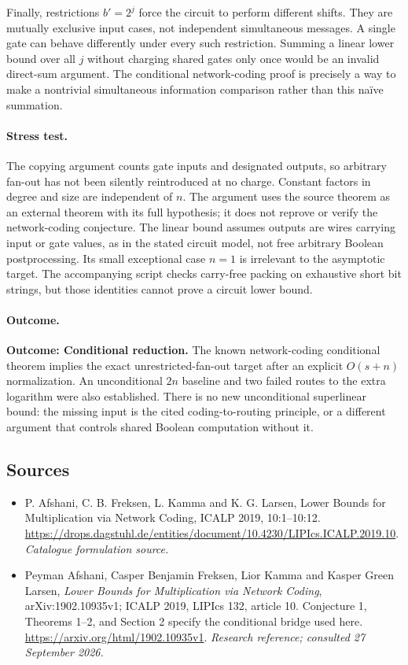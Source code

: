 \documentclass[11pt,a4paper]{article}
\numberwithin{equation}{section}
\begin{document}
Finally, restrictions $b'=2^j$ force the circuit to perform different shifts. They are mutually exclusive input cases, not independent simultaneous messages. A single gate can behave differently under every such restriction. Summing a linear lower bound over all $j$ without charging shared gates only once would be an invalid direct-sum argument. The conditional network-coding proof is precisely a way to make a nontrivial simultaneous information comparison rather than this naïve summation.

\paragraph{Stress test.}
The copying argument counts gate inputs and designated outputs, so arbitrary fan-out has not been silently reintroduced at no charge. Constant factors in degree and size are independent of $n$. The argument uses the source theorem as an external theorem with its full hypothesis; it does not reprove or verify the network-coding conjecture. The linear bound assumes outputs are wires carrying input or gate values, as in the stated circuit model, not free arbitrary Boolean postprocessing. Its small exceptional case $n=1$ is irrelevant to the asymptotic target. The accompanying script checks carry-free packing on exhaustive short bit strings, but those identities cannot prove a circuit lower bound.

\paragraph{Outcome.}
\textbf{Outcome: Conditional reduction.}
The known network-coding conditional theorem implies the exact unrestricted-fan-out target after an explicit $O(s+n)$ normalization. An unconditional $2n$ baseline and two failed routes to the extra logarithm were also established. There is no new unconditional superlinear bound: the missing input is the cited coding-to-routing principle, or a different argument that controls shared Boolean computation without it.

\subsection{Sources}
\begin{itemize}\raggedright
\item[\textnormal{[S1]}]\hypertarget{source:189:1}{} P. Afshani, C. B. Freksen, L. Kamma and K. G. Larsen, Lower Bounds for Multiplication via Network Coding, ICALP 2019, 10:1–10:12.
\url{https://drops.dagstuhl.de/entities/document/10.4230/LIPIcs.ICALP.2019.10}.
{\small\textit{Catalogue formulation source.}}
\item[\textnormal{[E1]}]\hypertarget{extra:189:1}{} Peyman Afshani, Casper Benjamin Freksen, Lior Kamma and Kasper Green Larsen, \emph{Lower Bounds for Multiplication via Network Coding}, arXiv:1902.10935v1; ICALP 2019, LIPIcs 132, article 10. Conjecture 1, Theorems 1--2, and Section 2 specify the conditional bridge used here.
\url{https://arxiv.org/html/1902.10935v1}.
{\small\textit{Research reference; consulted 27 September 2026.}}
\end{itemize}
\end{document}
